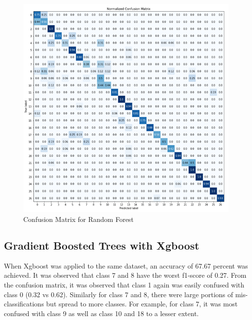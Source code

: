 \documentclass[conference]{IEEEtran}
\begin{document}
\begin{figure}[H]
\begin{center}
\includegraphics[scale=1]{Image/rf_27_class_confusion.png}
\caption{\label{rf_27_class_confusion} Confusion Matrix for Random Forest}
\end{center}
\end{figure}

\subsection{Gradient Boosted Trees with Xgboost}

When Xgboost was applied to the same dataset, an accuracy of 67.67 percent was achieved. It was observed that class 7 and 8 have the worst f1-score of 0.27. From the confusion matrix, it was observed that class 1 again was easily confused with class 0 (0.32 vs 0.62). Similarly for class 7 and 8, there were large portions of mis-classifications but spread to more classes. For example, for class 7, it was most confused with class 9 as well as class 10 and 18 to a lesser extent.
\end{document}
